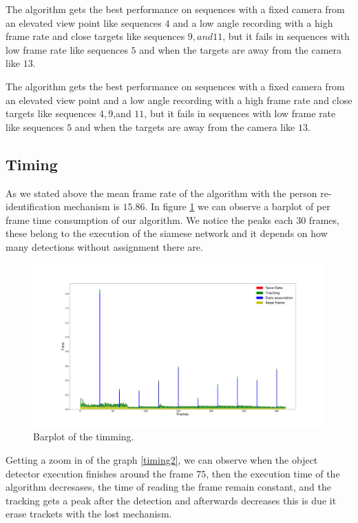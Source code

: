 The algorithm gets the best performance on sequences with a fixed camera from an elevated view point like sequences $4$ and a low angle recording with a high frame rate and close targets like sequences $9,and 11$, but it fails in sequences with low frame rate like sequences $5$ and when the targets are away from the camera like $13$.

The algorithm gets the best performance on sequences with a fixed camera from an elevated view point and a low angle recording with a high frame rate and close targets like sequences $4,9$,and $11$, but it fails in sequences with low frame rate like sequences $5$ and when the targets are away from the camera like $13$.


\subsection{Timing}


As we stated above the mean frame rate of the algorithm with the person re-identification mechanism is $15.86$. In figure \ref{timing1} we can observe a barplot of per frame time consumption of our algorithm.  We notice the peaks each $30$ frames, these belong to the execution of the siamese network and it depends on how many detections without assignment there are.

\begin{figure}[H]
\centering         
\includegraphics[width=0.9\linewidth]{graphicsRearrange/temps/timeGenral.png}
\caption{Barplot of the timming.} \label{timing1}
\end{figure}

Getting a zoom in of the graph \ref{timing2}, we can observe when the object detector execution finishes around the frame $75$, then the execution time of the algorithm decresases, the time of reading the frame remain constant, and the tracking gets a peak after the detection and afterwards decreases this is due it erase trackets with the lost mechanism. 

